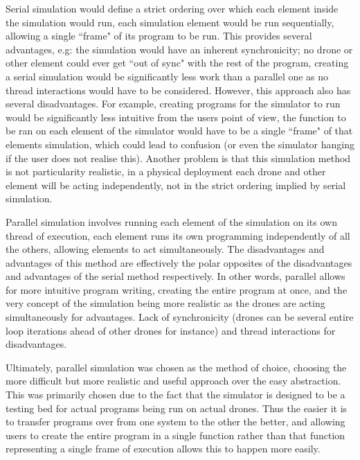 Serial simulation would define a strict ordering over which each element inside the simulation would run, each simulation element would be run sequentially, allowing a single ``frame" of its program to be run. This provides several advantages, e.g: the simulation would have an inherent synchronicity; no drone or other element could ever get ``out of sync" with the rest of the program, creating a serial simulation would be significantly less work than a parallel one as no thread interactions would have to be considered. However, this approach also has several disadvantages. For example, creating programs for the simulator to run would be significantly less intuitive from the users point of view, the function to be ran on each element of the simulator would have to be a single ``frame" of that elements simulation, which could lead to confusion (or even the simulator hanging if the user does not realise this). Another problem is that this simulation method is not particularity realistic, in a physical deployment each drone and other element will be acting independently, not in the strict ordering implied by serial simulation.

Parallel simulation involves running each element of the simulation on its own thread of execution, each element runs its own programming independently of all the others, allowing elements to act simultaneously. The disadvantages and advantages of this method are effectively the polar opposites of the disadvantages and advantages of the serial method respectively. In other words, parallel allows for more intuitive program writing, creating the entire program at once, and the very concept of the simulation being more realistic as the drones are acting simultaneously for advantages. Lack of synchronicity (drones can be several entire loop iterations ahead of other drones for instance) and thread interactions for disadvantages.

Ultimately, parallel simulation was chosen as the method of choice, choosing the more difficult but more realistic and useful approach over the easy abstraction. This was primarily chosen due to the fact that the simulator is designed to be a testing bed for actual programs being run on actual drones. Thus the easier it is to transfer programs over from one system to the other the better, and allowing users to create the entire program in a single function rather than that function representing a single frame of execution allows this to happen more easily.

